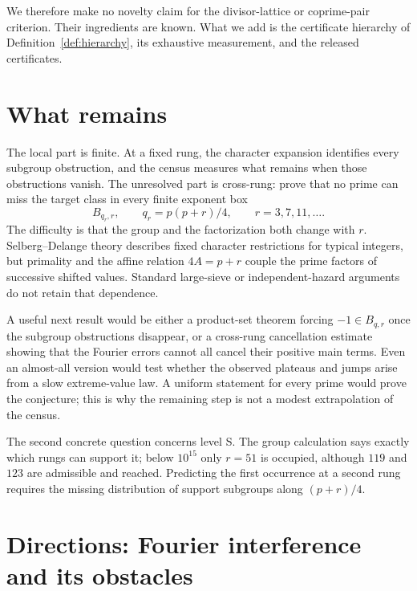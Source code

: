 \documentclass[11pt]{article}
\theoremstyle{definition}
\theoremstyle{remark}
\begin{document}
We therefore make no novelty claim for the divisor-lattice or coprime-pair criterion.
Their ingredients are known. What we add is the certificate hierarchy of
Definition~\ref{def:hierarchy}, its exhaustive measurement, and the released
certificates.

\section{What remains}\label{sec:remaining}

The local part is finite. At a fixed rung, the character expansion identifies every
subgroup obstruction, and the census measures what remains when those obstructions
vanish. The unresolved part is cross-rung: prove that no prime can miss the target
class in every finite exponent box
\[
B_{q_r,r},\qquad q_r=p(p+r)/4,\qquad r=3,7,11,\ldots .
\]
The difficulty is that the group and the factorization both change with $r$.
Selberg--Delange theory describes fixed character restrictions for typical integers,
but primality and the affine relation $4A=p+r$ couple the prime factors of successive
shifted values. Standard large-sieve or independent-hazard arguments do not retain
that dependence.

A useful next result would be either a product-set theorem forcing $-1\in B_{q,r}$ once
the subgroup obstructions disappear, or a cross-rung cancellation estimate showing
that the Fourier errors cannot all cancel their positive main terms. Even an
almost-all version would test whether the observed plateaus and jumps arise from a
slow extreme-value law. A uniform statement for every prime would prove the
conjecture; this is why the remaining step is not a modest extrapolation of the census.

The second concrete question concerns level S. The group calculation says exactly
which rungs can support it; below $10^{15}$ only $r=51$ is occupied, although $119$
and $123$ are admissible and reached. Predicting the first occurrence at a second rung
requires the missing distribution of support subgroups along $(p+r)/4$.

\iffalse

\section{Directions: Fourier interference and its obstacles}\label{sec:doorways}
\end{document}
